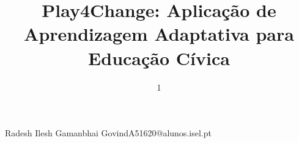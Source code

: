 \def\thetitle{%
 Play4Change: Aplicação de Aprendizagem Adaptativa para Educação Cívica
}
\def\theauthor{%
 Radesh Govind
}

\title{ \thetitle }

\author{1}{Radesh Ilesh Gamanbhai Govind}{A51620@alunos.isel.pt}


